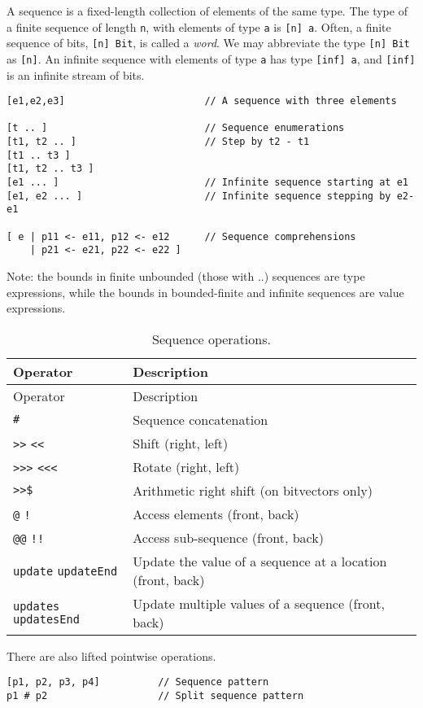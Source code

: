 A sequence is a fixed-length collection of elements of the same type.
The type of a finite sequence of length \texttt{n}, with elements of
type \texttt{a} is \texttt{{[}n{]}\ a}. Often, a finite sequence of
bits, \texttt{{[}n{]}\ Bit}, is called a \emph{word}. We may abbreviate
the type \texttt{{[}n{]}\ Bit} as \texttt{{[}n{]}}. An infinite sequence
with elements of type \texttt{a} has type \texttt{{[}inf{]}\ a}, and
\texttt{{[}inf{]}} is an infinite stream of bits.

\begin{verbatim}
[e1,e2,e3]                        // A sequence with three elements

[t .. ]                           // Sequence enumerations
[t1, t2 .. ]                      // Step by t2 - t1
[t1 .. t3 ]
[t1, t2 .. t3 ]
[e1 ... ]                         // Infinite sequence starting at e1
[e1, e2 ... ]                     // Infinite sequence stepping by e2-e1

[ e | p11 <- e11, p12 <- e12      // Sequence comprehensions
    | p21 <- e21, p22 <- e22 ]
\end{verbatim}

Note: the bounds in finite unbounded (those with ..) sequences are type
expressions, while the bounds in bounded-finite and infinite sequences
are value expressions.

\begin{longtable}[]{@{}ll@{}}
\caption{Sequence operations.}\tabularnewline
\toprule
Operator & Description\tabularnewline
\midrule
\endfirsthead
\toprule
Operator & Description\tabularnewline
\midrule
\endhead
\texttt{\#} & Sequence concatenation\tabularnewline
\texttt{\textgreater{}\textgreater{}} \texttt{\textless{}\textless{}} &
Shift (right, left)\tabularnewline
\texttt{\textgreater{}\textgreater{}\textgreater{}}
\texttt{\textless{}\textless{}\textless{}} & Rotate (right,
left)\tabularnewline
\texttt{\textgreater{}\textgreater{}\$} & Arithmetic right shift (on
bitvectors only)\tabularnewline
\texttt{@} \texttt{!} & Access elements (front, back)\tabularnewline
\texttt{@@} \texttt{!!} & Access sub-sequence (front,
back)\tabularnewline
\texttt{update} \texttt{updateEnd} & Update the value of a sequence at a
location (front, back)\tabularnewline
\texttt{updates} \texttt{updatesEnd} & Update multiple values of a
sequence (front, back)\tabularnewline
\bottomrule
\end{longtable}

There are also lifted pointwise operations.

\begin{verbatim}
[p1, p2, p3, p4]          // Sequence pattern
p1 # p2                   // Split sequence pattern
\end{verbatim}

